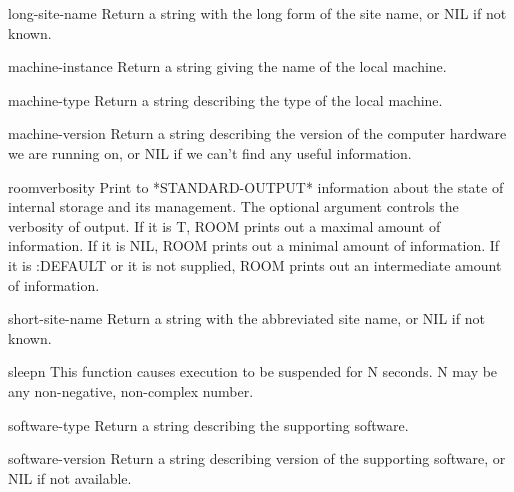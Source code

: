 \begin{function}{long-site-name}{}{}{}
  Return a string with the long form of the site name, or NIL if not known.
\end{function}

\begin{function}{machine-instance}{}{}{}
  Return a string giving the name of the local machine.
\end{function}

\begin{function}{machine-type}{}{}{}
  Return a string describing the type of the local machine.
\end{function}

\begin{function}{machine-version}{}{}{}
  Return a string describing the version of the computer hardware we
are running on, or NIL if we can't find any useful information.
\end{function}

\begin{function}{room}{\op verbosity}{}{}
  Print to *STANDARD-OUTPUT* information about the state of internal
  storage and its management. The optional argument controls the
  verbosity of output. If it is T, ROOM prints out a maximal amount of
  information. If it is NIL, ROOM prints out a minimal amount of
  information. If it is :DEFAULT or it is not supplied, ROOM prints out
  an intermediate amount of information.
\end{function}

\begin{function}{short-site-name}{}{}{}
  Return a string with the abbreviated site name, or NIL if not known.
\end{function}

\begin{function}{sleep}{n}{}{}
  This function causes execution to be suspended for N seconds. N may
  be any non-negative, non-complex number.
\end{function}

\begin{function}{software-type}{}{}{}
  Return a string describing the supporting software.
\end{function}

\begin{function}{software-version}{}{}{}
  Return a string describing version of the supporting software, or NIL
  if not available.
\end{function}

